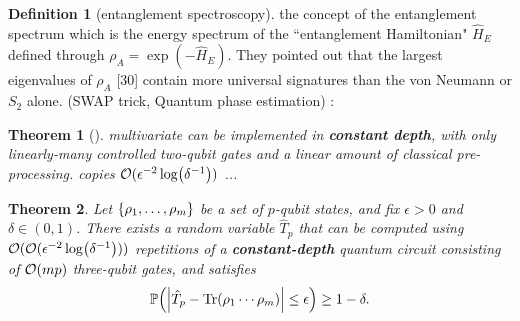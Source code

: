 \documentclass[
10pt,
aps,
pra,
linenumbers,
floatfix,
]{revtex4-2}
\theoremstyle{plain}
\newtheorem{theorem}{Theorem}
\theoremstyle{definition}
\newtheorem{definition}{Definition}
\newcommand{\hamiltonian}{\hat{H}}
\newcommand{\dm}{\rho}
\begin{document}
\begin{definition}[entanglement spectroscopy]\label{def:entanglement_spectroscopy}
	the concept of the entanglement spectrum which is the energy spectrum of the ``entanglement Hamiltonian" $\hamiltonian_E$ defined through $\dm_A = \exp(−\hamiltonian_E )$. They pointed out that the largest eigenvalues of $\dm_A$ [30] contain more universal signatures than the von Neumann  or $S_2$ alone. (SWAP trick, Quantum phase estimation)
	\cite{johriEntanglementSpectroscopyQuantum2017}:
\end{definition}

\begin{theorem}[\cite{quekMultivariateTraceEstimation2022}]\label{thm:multivariate_trace}
	multivariate  can be implemented in \textbf{constant depth}, with only linearly-many controlled two-qubit gates and a linear amount of classical pre-processing.
	copies $\mathcal{O}(\epsilon^{-2}\log( \delta^{-1}))$ ...
\end{theorem}
\begin{theorem}
	Let $\qty{\dm_1,\dots,\dm_m}$ be a set of $p$-qubit states, and fix $\epsilon > 0$ and $\delta \in (0,1)$.
	There exists a random variable $\hat{T}_p$ that can be computed using $\mathcal{O}(\mathcal{O}(\epsilon^{-2}\log( \delta^{-1})))$ repetitions of a \textbf{constant-depth} quantum circuit consisting of $\mathcal{O}(mp)$ three-qubit gates, and satisfies 
	\begin{equation}
		\probability\qty(\abs{\hat{T}_p - \Tr(\dm_1\cdots\dm_m)}\le \epsilon) \ge 1 -\delta.
	\end{equation}
\end{theorem}
\end{document}
